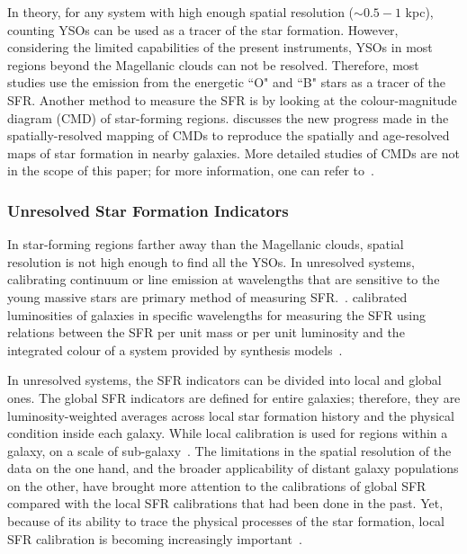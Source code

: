 In theory, for any system with high enough spatial resolution ($\sim 0.5- 1$ kpc), counting YSOs can be used as a tracer of the star formation. 
However, considering the limited capabilities of the present instruments, YSOs in most regions beyond the Magellanic clouds can not be resolved. 
Therefore, most studies use the emission from the energetic ``O" and ``B" stars as a tracer of the SFR. 
Another method to measure the SFR is by looking at the colour-magnitude diagram (CMD) of star-forming regions. 
\cite{Kennicutt12} discusses the new progress made in the spatially-resolved mapping of CMDs to reproduce the spatially and age-resolved maps of star formation in nearby galaxies. 
More detailed studies of CMDs are not in the scope of this paper; for more information, one can refer to~\citep{Kennicutt12}. 

\subsubsection{Unresolved Star Formation Indicators}

 In star-forming regions farther away than the Magellanic clouds, spatial resolution is not high enough to find all the YSOs. 
 In unresolved systems, calibrating continuum or line emission at wavelengths that are sensitive to the young massive stars are primary method of measuring SFR.~\citep[e.g.,][]{Kennicutt98b, Kewley02, Bell03, Calzetti07, Calzetti08, Calzetti10, Calzetti13, Kennicutt07, Kennicutt09, Boquien10, Hao11, Kennicutt12}. 
\cite{Kennicutt98b} calibrated luminosities of galaxies in specific wavelengths for measuring the SFR using relations between the SFR per unit mass or per unit luminosity and the integrated colour of a system provided by synthesis models~\citep[e.g.,][]{Bruzual93}. 

In unresolved systems, the SFR indicators can be divided into local and global ones. 
The global SFR indicators are defined for entire galaxies; therefore, they are luminosity-weighted averages across local star formation history and the physical condition inside each galaxy. 
While local calibration is used for regions within a galaxy, on a scale of sub-galaxy~\citep[e.g.,][]{Zhu08, Kennicutt09, Boquien10, Boquien11, Hao11}.
The limitations in the spatial resolution of the data on the one hand, and the broader applicability of distant galaxy populations on the other, have brought more attention to the calibrations of global SFR compared with the local SFR calibrations that had been done in the past. 
Yet, because of its ability to trace the physical processes of the star formation, local SFR calibration is becoming increasingly important~\citep{Calzetti13}.

